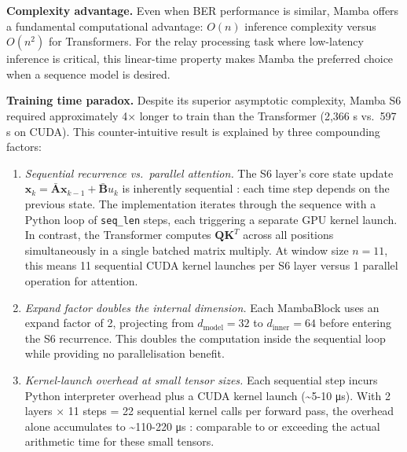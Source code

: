 \textbf{Complexity advantage.} Even when BER performance is similar, Mamba offers a fundamental computational advantage: \(O(n)\) inference complexity versus \(O(n^2)\) for Transformers. For the relay processing task where low-latency inference is critical, this linear-time property makes Mamba the preferred choice when a sequence model is desired.

\textbf{Training time paradox.} Despite its superior asymptotic complexity, Mamba S6 required approximately 4× longer to train than the Transformer (2,366 s vs.~597 s on CUDA). This counter-intuitive result is explained by three compounding factors:

\begin{enumerate}
\def\labelenumi{\arabic{enumi}.}
\item
  \emph{Sequential recurrence vs.~parallel attention.} The S6 layer's core state update \(\mathbf{x}_k = \bar{\mathbf{A}} \mathbf{x}_{k-1} + \bar{\mathbf{B}} u_k\) is inherently sequential : each time step depends on the previous state. The implementation iterates through the sequence with a Python loop of \texttt{seq\_len} steps, each triggering a separate GPU kernel launch. In contrast, the Transformer computes \(\mathbf{Q}\mathbf{K}^T\) across all positions simultaneously in a single batched matrix multiply. At window size \(n = 11\), this means 11 sequential CUDA kernel launches per S6 layer versus 1 parallel operation for attention.
\item
  \emph{Expand factor doubles the internal dimension.} Each MambaBlock uses an expand factor of 2, projecting from \(d_\text{model} = 32\) to \(d_\text{inner} = 64\) before entering the S6 recurrence. This doubles the computation inside the sequential loop while providing no parallelisation benefit.
\item
  \emph{Kernel-launch overhead at small tensor sizes.} Each sequential step incurs Python interpreter overhead plus a CUDA kernel launch (\textasciitilde5-10 μs). With 2 layers × 11 steps = 22 sequential kernel calls per forward pass, the overhead alone accumulates to \textasciitilde110-220 μs : comparable to or exceeding the actual arithmetic time for these small tensors.
\end{enumerate}

